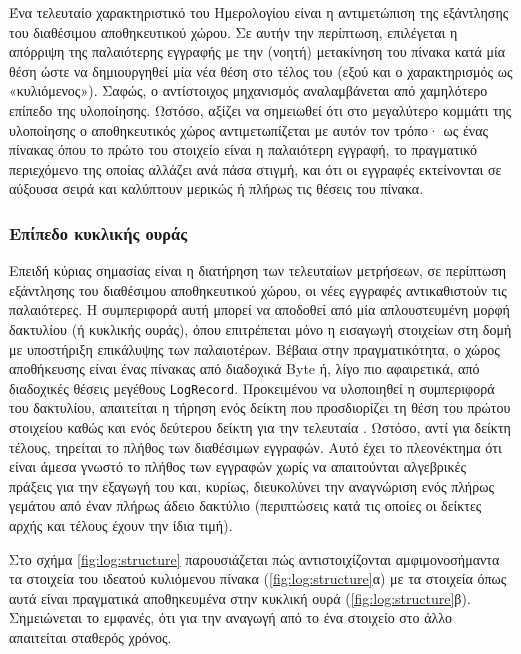 Ένα τελευταίο χαρακτηριστικό του Ημερολογίου είναι η αντιμετώπιση της εξάντλησης
του διαθέσιμου αποθηκευτικού χώρου. Σε αυτήν την περίπτωση, επιλέγεται η
απόρριψη της παλαιότερης εγγραφής με την (νοητή) μετακίνηση του πίνακα κατά μία
θέση ώστε να δημιουργηθεί μία νέα θέση στο τέλος του (εξού και ο χαρακτηρισμός
ως «κυλιόμενος»). Σαφώς, ο αντίστοιχος μηχανισμός αναλαμβάνεται από χαμηλότερο
επίπεδο της υλοποίησης. Ωστόσο, αξίζει να σημειωθεί ότι στο μεγαλύτερο κομμάτι
της υλοποίησης ο αποθηκευτικός χώρος αντιμετωπίζεται με αυτόν τον τρόπο· ως ένας
πίνακας όπου το πρώτο του στοιχείο είναι η παλαιότερη εγγραφή, το πραγματικό
περιεχόμενο της οποίας αλλάζει ανά πάσα στιγμή, και ότι οι εγγραφές εκτείνονται
σε αύξουσα σειρά και καλύπτουν μερικώς ή πλήρως τις θέσεις του πίνακα.

\subsubsection{Επίπεδο κυκλικής ουράς}

Επειδή κύριας σημασίας είναι η διατήρηση των τελευταίων μετρήσεων, σε περίπτωση
εξάντλησης του διαθέσιμου αποθηκευτικού χώρου, οι νέες εγγραφές αντικαθιστούν
τις παλαιότερες. Η συμπεριφορά αυτή μπορεί να αποδοθεί από μία απλουστευμένη
μορφή δακτυλίου (ή κυκλικής ουράς), όπου επιτρέπεται μόνο η εισαγωγή στοιχείων
στη δομή με υποστήριξη επικάλυψης των παλαιοτέρων. Βέβαια στην πραγματικότητα, ο
χώρος αποθήκευσης είναι ένας πίνακας από διαδοχικά Byte ή, λίγο πιο αφαιρετικά,
από διαδοχικές θέσεις μεγέθους \verb~LogRecord~. Προκειμένου να υλοποιηθεί η
συμπεριφορά του δακτυλίου, απαιτείται η τήρηση ενός δείκτη που προσδιορίζει τη
θέση του πρώτου στοιχείου καθώς και ενός δεύτερου δείκτη για την τελευταία
\parencite[131]{kolias04}. Ωστόσο, αντί για δείκτη τέλους, τηρείται το πλήθος
των διαθέσιμων εγγραφών. Αυτό έχει το πλεονέκτημα ότι είναι άμεσα γνωστό το
πλήθος των εγγραφών χωρίς να απαιτούνται αλγεβρικές πράξεις για την εξαγωγή του
και, κυρίως, διευκολύνει την αναγνώριση ενός πλήρως γεμάτου από έναν πλήρως
άδειο δακτύλιο (περιπτώσεις κατά τις οποίες οι δείκτες αρχής και τέλους έχουν
την ίδια τιμή).

Στο σχήμα \ref{fig:log:structure} παρουσιάζεται πώς αντιστοιχίζονται
αμφιμονοσήμαντα τα στοιχεία του ιδεατού κυλιόμενου πίνακα
(\ref{fig:log:structure}α) με τα στοιχεία όπως αυτά είναι πραγματικά
αποθηκευμένα στην κυκλική ουρά (\ref{fig:log:structure}β). Σημειώνεται το
εμφανές, ότι για την αναγωγή από το ένα στοιχείο στο άλλο απαιτείται σταθερός
χρόνος.

